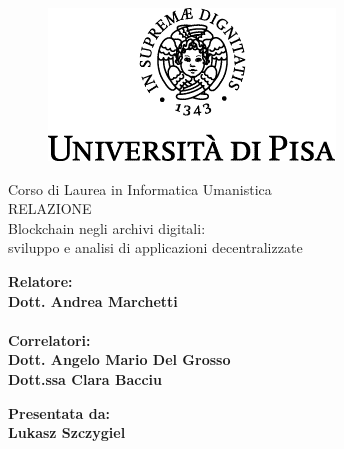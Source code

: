 \documentclass[12pt]{report}
\begin{document}
\begin{titlepage}
\begin{figure}
    \centering\includegraphics{logo}
\end{figure}

\begin{center}
    {\LARGE{ Corso di Laurea in Informatica Umanistica }}\\
    \vspace{2cm}
    {\Large { RELAZIONE }}\\
    \vspace{2cm}
    {\Large { Blockchain negli archivi digitali: \\ sviluppo e analisi di applicazioni decentralizzate }}
\end{center}

\vspace{2cm}

\begin{minipage}[t]{0.47\textwidth}
	{\large{\bf Relatore:\\ Dott. Andrea Marchetti\\}}
	{\large{\bf \\Correlatori:\\ Dott. Angelo Mario Del Grosso\\ Dott.ssa Clara Bacciu}}
\end{minipage}\hfill\begin{minipage}[t]{0.47\textwidth}\raggedleft
	{\large{\bf Presentata da: \\ Lukasz Szczygiel\\ }}
\end{minipage}

\vspace{18mm}

\end{titlepage}

\tableofcontents

\listoffigures







\printbibliography
\end{document}
